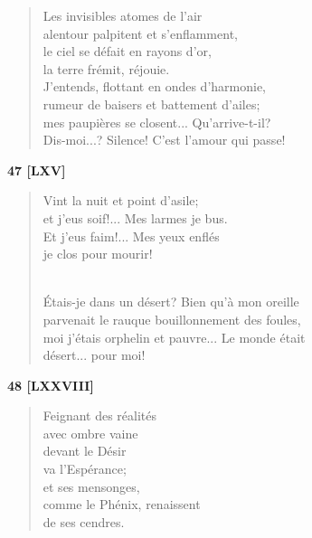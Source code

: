 \documentclass[a4paper,12pt]{book}
\begin{document}
\begin{verse}
Les invisibles atomes de l'air \\
alentour palpitent et s'enflamment, \\
le ciel se défait en rayons d'or, \\
la terre frémit, réjouie. \\
J'entends, flottant en ondes d'harmonie, \\
rumeur de baisers et battement d'ailes; \\
mes paupières se closent... Qu'arrive-t-il? \\
Dis-moi...? Silence! C'est l'amour qui passe! \\
\end{verse}

\bigskip

\begin{center} {\bf 47 [LXV]} \end{center}

\begin{verse}
Vint la nuit et point d'asile; \\
et j'eus soif!... Mes larmes je bus. \\
Et j'eus faim!... Mes yeux enflés \\
je clos pour mourir! \\ \

Étais-je dans un désert? Bien qu'à mon oreille \\
parvenait le rauque bouillonnement des foules, \\
moi j'étais orphelin et pauvre... Le monde était \\
désert... pour moi! \\
\end{verse}

\bigskip

\begin{center} {\bf 48 [LXXVIII]} \end{center}

\begin{verse}
Feignant des réalités \\
avec ombre vaine \\
devant le Désir \\
va l'Espérance; \\
et ses mensonges, \\
comme le Phénix, renaissent \\
de ses cendres. \\
\end{verse}
\end{document}
